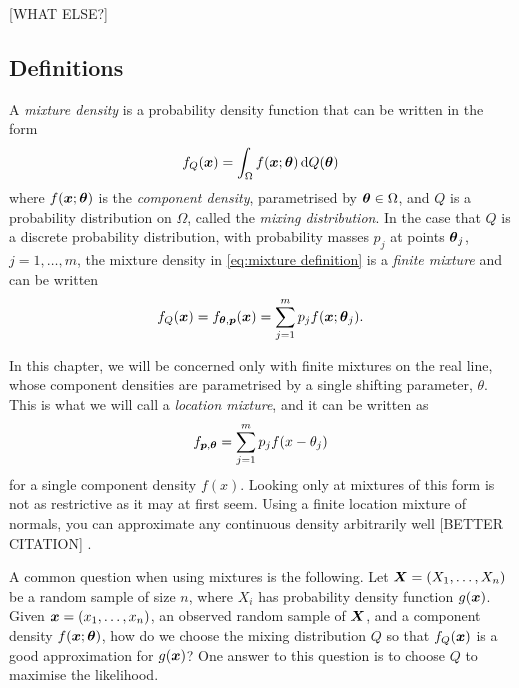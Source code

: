	[WHAT ELSE?]

	\subsection{Definitions}
	A \emph{mixture density} is a probability density function that can be written in the form
	\begin{equation}
		f_Q({\bm{{x}}}) = \int_\Omega f({\bm{{x}}}; {\bm{{\theta}}}) \, \mathrm{d} Q({\bm{{\theta}}})
		\label{eq:mixture definition}
	\end{equation}
	where $f({\bm{{x}}};{\bm{{\theta}}})$ is the \emph{component density}, parametrised by ${\bm{{\theta}}} \in \Omega$, and $Q$ is a probability distribution on $\Omega$, called the \emph{mixing distribution}. In the case that $Q$ is a discrete probability distribution, with probability masses $p_j$ at points ${\bm{{\theta}}}_j$, $j = 1, \dots, m$, the mixture density in \eqref{eq:mixture definition} is a \emph{finite mixture} and can be written
	\begin{equation}
		f_Q({\bm{{x}}}) = f_{{\bm{{\theta}}}, {\bm{{p}}}}({\bm{{x}}}) = \sum_{j = 1}^m p_j f({\bm{{x}}}; {\bm{{\theta}}}_j).
	\end{equation}

	In this chapter, we will be concerned only with finite mixtures on the real line, whose component densities are parametrised by a single shifting parameter, $\theta$. This is what we will call a \emph{location mixture}, and it can be written as
	\begin{equation}
		f_{{\bm{{p}}}, {\bm{{\theta}}}} = \sum_{j = 1}^m p_j f(x - \theta_j)
	\end{equation}
	for a single component density $f(x)$.
	Looking only at mixtures of this form is not as restrictive as it may at first seem. Using a finite location mixture of normals, you can approximate any continuous density arbitrarily well [BETTER CITATION] \cite{McLachlan2004-ik}.

	A common question when using mixtures is the following. Let ${\bm{{X}}} = (X_1, \dots, X_n)$ be a random sample of size $n$, where $X_i$ has probability density function $g({\bm{{x}}})$. Given ${\bm{{x}}} = (x_1, \dots, x_n)$, an observed random sample of ${\bm{{X}}}$, and a component density $f({\bm{{x}}}; {\bm{{\theta}}})$, how do we choose the mixing distribution $Q$ so that $f_Q({\bm{{x}}})$ is a good approximation for $g({\bm{{x}}})$?	One answer to this question is to choose $Q$ to maximise the likelihood.

